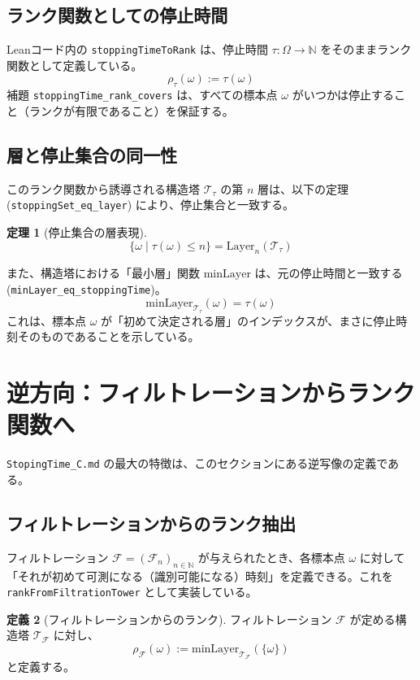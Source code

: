 \documentclass[a4paper,11pt]{ltjsarticle}
\theoremstyle{definition}
\newtheorem{definition}{定義}[section]
\newtheorem{theorem}[definition]{定理}
\newcommand{\N}{\mathbb{N}}
\newcommand{\OmegaSpace}{\Omega}
\newcommand{\Filtration}{\mathcal{F}}
\newcommand{\Tau}{\tau}
\newcommand{\Rank}{\rho}
\newcommand{\Tower}{\mathcal{T}}
\newcommand{\Layer}[1]{\mathrm{Layer}_{#1}}
\newcommand{\MinLayer}{\mathrm{minLayer}}
\begin{document}
\subsection{ランク関数としての停止時間}
Leanコード内の \texttt{stoppingTimeToRank} は、停止時間 $\Tau: \OmegaSpace \to \N$ をそのままランク関数として定義している。
\[
    \Rank_\Tau(\omega) := \Tau(\omega)
\]
補題 \texttt{stoppingTime\_rank\_covers} は、すべての標本点 $\omega$ がいつかは停止すること（ランクが有限であること）を保証する。

\subsection{層と停止集合の同一性}
このランク関数から誘導される構造塔 $\Tower_\Tau$ の第 $n$ 層は、以下の定理 (\texttt{stoppingSet\_eq\_layer}) により、停止集合と一致する。
\begin{theorem}[停止集合の層表現]
\[
    \{\omega \mid \Tau(\omega) \le n\} = \Layer{n}(\Tower_\Tau)
\]
\end{theorem}

また、構造塔における「最小層」関数 $\MinLayer$ は、元の停止時間と一致する (\texttt{minLayer\_eq\_stoppingTime})。
\[
    \MinLayer_{\Tower_\Tau}(\omega) = \Tau(\omega)
\]
これは、標本点 $\omega$ が「初めて決定される層」のインデックスが、まさに停止時刻そのものであることを示している。

\section{逆方向：フィルトレーションからランク関数へ}

\texttt{StopingTime\_C.md} の最大の特徴は、このセクションにある逆写像の定義である。

\subsection{フィルトレーションからのランク抽出}
フィルトレーション $\Filtration = (\Filtration_n)_{n \in \N}$ が与えられたとき、各標本点 $\omega$ に対して「それが初めて可測になる（識別可能になる）時刻」を定義できる。これを \texttt{rankFromFiltrationTower} として実装している。

\begin{definition}[フィルトレーションからのランク]
フィルトレーション $\Filtration$ が定める構造塔 $\Tower_\Filtration$ に対し、
\[
    \Rank_\Filtration(\omega) := \MinLayer_{\Tower_\Filtration}(\{\omega\})
\]
と定義する。
\end{definition}
\end{document}
